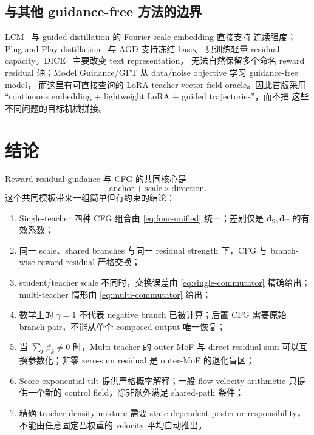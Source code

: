 \documentclass[11pt,a4paper]{article}
\newcommand{\student}{\mathrm{S}}
\newcommand{\teacher}{\mathrm{T}}
\theoremstyle{definition}
\theoremstyle{plain}
\begin{document}
\subsection{与其他 guidance-free 方法的边界}

LCM~\cite{lcm} 与 guided distillation 的 Fourier scale embedding 直接支持
连续强度；Plug-and-Play distillation~\cite{pnpdistill} 与 AGD 支持冻结 base、
只训练轻量 residual capacity。DICE~\cite{dice} 主要改变 text representation，
无法自然保留多个命名 reward residual 轴；Model Guidance/GFT
\cite{modelguidance,gft} 从 data/noise objective 学习 guidance-free model，
而这里有可直接查询的 LoRA teacher vector-field oracle。因此首版采用
``continuous embedding + lightweight LoRA + guided trajectories''，而不把
这些不同问题的目标机械拼接。

\section{结论}

Reward-residual guidance 与 CFG 的共同核心是
\begin{equation}
  \text{anchor}+\text{scale}\times\text{direction}.
  \label{eq:shared-template}
\end{equation}
这个共同模板带来一组简单但有约束的结论：
\begin{enumerate}[leftmargin=1.6em]
  \item Single-teacher 四种 CFG 组合由
  \eqref{eq:four-unified} 统一；差别仅是
  $\bm d_\student,\bm d_\teacher$ 的有效系数；
  \item 同一 scale、shared branches 与同一 residual strength 下，CFG 与
  branch-wise reward residual 严格交换；
  \item student/teacher scale 不同时，交换误差由
  \eqref{eq:single-commutator} 精确给出；multi-teacher 情形由
  \eqref{eq:multi-commutator} 给出；
  \item 数学上的 $\gamma=1$ 不代表 negative branch 已被计算；后置 CFG
  需要原始 branch pair，不能从单个 composed output 唯一恢复；
  \item 当 $\sum_k\beta_k\neq0$ 时，Multi-teacher 的 outer-MoF 与 direct
  residual sum 可以互换参数化；非零 zero-sum residual 是 outer-MoF 的退化盲区；
  \item Score exponential tilt 提供严格概率解释；一般 flow velocity arithmetic
  只提供一个新的 control field，除非额外满足 shared-path 条件；
  \item 精确 teacher density mixture 需要 state-dependent posterior responsibility，
  不能由任意固定凸权重的 velocity 平均自动推出。
\end{enumerate}
\end{document}
